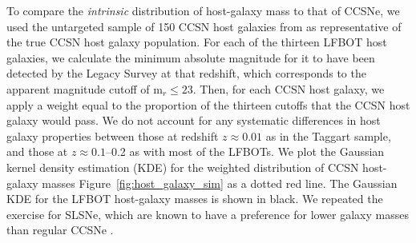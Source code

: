 \documentclass[twocolumn,twocolappendix, linenumbers, trackchanges]{aastex7}
\begin{document}
To compare the \emph{intrinsic} distribution of host-galaxy mass to that of CCSNe, we used the untargeted sample of 150 CCSN host galaxies from \citet{taggart2021} as representative of the true CCSN host galaxy population.    For each of the thirteen LFBOT host galaxies, we calculate the minimum absolute magnitude for it to have been detected by the Legacy Survey at that redshift, which corresponds to the apparent magnitude cutoff of $\mathrm{m}_r\leq23$.  Then, for each CCSN host galaxy, we apply a weight equal to the proportion of the thirteen cutoffs that the CCSN host galaxy would pass. We do not account for any systematic differences in host galaxy properties between those at redshift $z\approx 0.01$ as in the Taggart sample, and those at $z\approx 0.1$--0.2 as with most of the LFBOTs.  We plot the Gaussian kernel density estimation (KDE) for the weighted distribution of CCSN host-galaxy masses Figure~\ref{fig:host_galaxy_sim} as a dotted red line.  The Gaussian KDE for the LFBOT host-galaxy masses is shown in black. We repeated the exercise for SLSNe, which are known to have a preference for lower galaxy masses than regular CCSNe \citep{taggart2021}.

\end{document}
